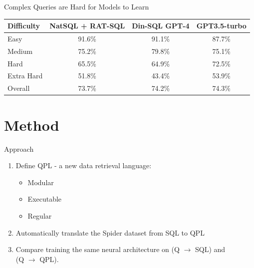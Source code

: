\documentclass{beamer}
\begin{document}
\begin{frame}{Complex Queries are Hard for Models to Learn}

\begin{table}[h]
\centering
\begin{tabular}{lccc}
\toprule
Difficulty & NatSQL + RAT-SQL & Din-SQL GPT-4 & GPT3.5-turbo\\
\midrule
Easy       & 91.6\% & 91.1\% & 87.7\% \\
Medium     & 75.2\% & 79.8\% & 75.1\% \\
Hard       & 65.5\% & 64.9\% & 72.5\% \\
Extra Hard & \alert{51.8\%} & \alert{43.4\%} & \alert{53.9\%} \\
\midrule
Overall & 73.7\% & 74.2\% & 74.3\% \\
\bottomrule
\end{tabular}
\end{table}
\end{frame}


\section{Method}

\begin{frame}{Approach}
\begin{enumerate}
    \item Define QPL - a new data retrieval language:
    \begin{itemize}
        \item Modular
        \item Executable
        \item Regular
    \end{itemize}
    
    \item Automatically translate the Spider dataset from SQL to QPL 

    \item Compare training the same neural architecture on (Q $\rightarrow$ SQL) and\\ (Q $\rightarrow$ QPL).
\end{enumerate}
    
\end{frame}
\end{document}
